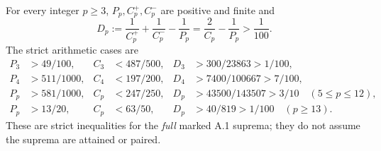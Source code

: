 \begin{theorem}\label{thm:gain}
For every integer $p\ge3$,
$P_p,C_p^+,C_p^-$ are
positive and finite and
\begin{equation}\label{eq:gain}
 D_p:=\frac1{C_p^+}+\frac1{C_p^-}
             -\frac1{P_p}
   =\frac2{C_p}-\frac1{P_p}>\frac1{100}.
\end{equation}
The strict arithmetic cases
are
\begin{align}
 P_3&>49/100,& C_3&<487/500,&
 D_3&>300/23863>1/100,\nonumber\\
 P_4&>511/1000,& C_4&<197/200,&
 D_4&>7400/100667>7/100,\label{eq:gain-cases}\\
 P_p&>581/1000,& C_p&<247/250,&
 D_p&>43500/143507>3/10\quad (5\le p\le12),
 \nonumber\\
 P_p&>13/20,& C_p&<63/50,&
 D_p&>40/819>1/100\quad (p\ge13).\nonumber
\end{align}
These are strict inequalities for the
\emph{full} marked A.1 suprema;
they do not assume the suprema
are attained or paired.
\end{theorem}
